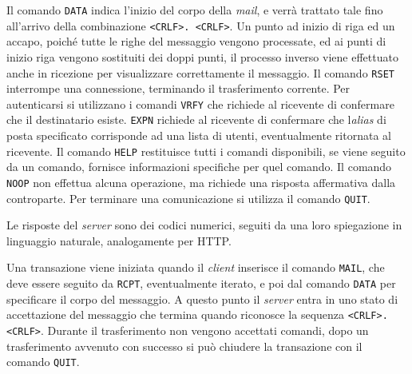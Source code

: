 \documentclass{article}
\numberwithin{equation}{subsection}
\begin{document}
Il comando \verb|DATA| indica l'inizio del corpo della \textit{mail}, e verrà trattato tale fino all'arrivo della combinazione \verb|<CRLF>. <CRLF>|. Un punto ad inizio di riga ed un accapo, poiché tutte le righe del messaggio vengono processate, ed ai punti di inizio riga vengono sostituiti dei doppi punti, il processo inverso viene effettuato anche in ricezione per visualizzare correttamente il messaggio. 
Il comando \verb|RSET| interrompe una connessione, terminando il trasferimento corrente. 
Per autenticarsi si utilizzano i comandi \verb|VRFY| che richiede al ricevente di confermare che il destinatario esiste. \verb|EXPN| richiede al ricevente di confermare che l\textit{alias} di posta specificato corrisponde ad una lista di utenti, eventualmente ritornata al ricevente. 
Il comando \verb|HELP| restituisce tutti i comandi disponibili, se viene seguito da un comando, fornisce informazioni specifiche per quel comando. 
Il comando \verb|NOOP| non effettua alcuna operazione, ma richiede una risposta affermativa dalla controparte. Per terminare una comunicazione si utilizza il comando \verb|QUIT|. 

Le risposte del \textit{server} sono dei codici numerici, seguiti da una loro spiegazione in linguaggio naturale, analogamente per \textcolor{NavyBlue}{HTTP}. 


Una transazione viene iniziata quando il \textit{client} inserisce il comando \verb|MAIL|, che deve essere seguito da \verb|RCPT|, eventualmente iterato, e poi dal comando \verb|DATA| per specificare il corpo del messaggio. A questo punto il \textit{server} entra in uno stato di accettazione del messaggio che termina quando riconosce la sequenza \verb|<CRLF>. <CRLF>|. Durante il trasferimento non vengono accettati comandi, dopo un trasferimento avvenuto con successo si può chiudere la transazione con il comando \verb|QUIT|. 
\end{document}
